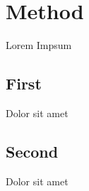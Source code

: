 \section{Method}
Lorem Impsum \cite{einstein}
\subsection{First}
Dolor sit amet
\subsection{Second}
Dolor sit amet